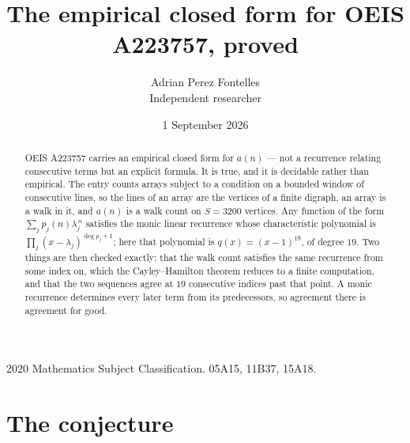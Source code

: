 \documentclass[11pt,a4paper]{article}
\title{The empirical closed form for OEIS A223757, proved}
\author{Adrian Perez Fontelles\\ \small Independent researcher}
\date{1 September 2026}
\theoremstyle{plain}
\theoremstyle{definition}
\begin{document}
\maketitle

\begin{abstract}
OEIS A223757 carries an empirical closed form for $a(n)$ --- not a recurrence relating
consecutive terms but an explicit formula. It is true, and it is decidable rather than
empirical. The entry counts arrays subject to a condition on a bounded window of consecutive lines, so the lines of an array are the
vertices of a finite digraph, an array is a walk in it, and $a(n)$ is a walk count on
$S=3200$ vertices. Any function of the form $\sum_j p_j(n)\lambda_j^{\,n}$ satisfies the
monic linear recurrence whose characteristic polynomial is
$\prod_j(x-\lambda_j)^{\deg p_j+1}$; here that polynomial is $q(x)=(x-1)^{19}$, of degree
$19$. Two things are then checked exactly: that the walk count satisfies the same
recurrence from some index on, which the Cayley--Hamilton theorem reduces to a finite
computation, and that the two sequences agree at $19$ consecutive indices past that
point. A monic recurrence determines every later term from its predecessors, so agreement
there is agreement for good.
\end{abstract}

\noindent\small 2020 Mathematics Subject Classification. 05A15, 11B37, 15A18.\normalsize

\section{The conjecture}
\end{document}
